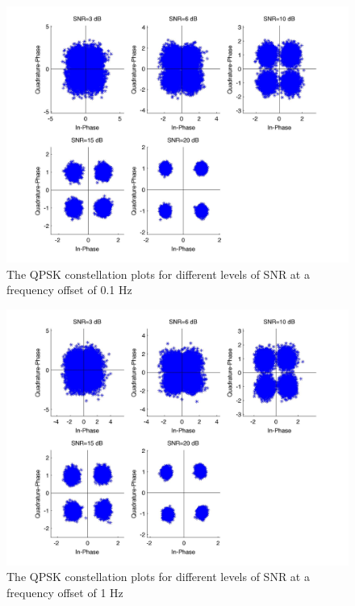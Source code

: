 \documentclass[]{article}
\begin{document}
\begin{figure}[H]
\centering
\hspace*{-2cm}\includegraphics[width=1.3\textwidth]{qpConstfo2.jpg}
\caption{The QPSK constellation plots for different levels of SNR at a frequency offset of 0.1 Hz}
\end{figure}

\begin{figure}[H]
\centering
\hspace*{-2cm}\includegraphics[width=1.3\textwidth]{qpConstfo3.jpg}
\caption{The QPSK constellation plots for different levels of SNR at a frequency offset of 1 Hz}
\end{figure}
\end{document}
